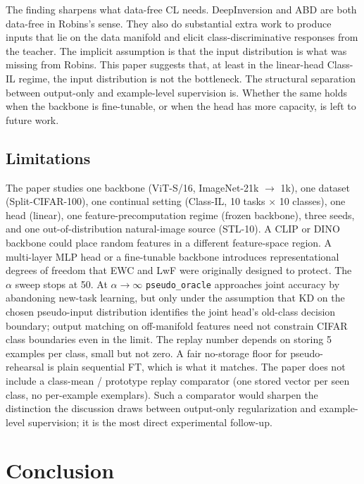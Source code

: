 \documentclass[conference]{IEEEtran}
\begin{document}
The finding sharpens what data-free CL needs. DeepInversion
\citep{yin2020deepinversion} and ABD \citep{smith2021abd} are both
data-free in Robins's sense. They also do substantial extra work to
produce inputs that lie on the data manifold and elicit class-discriminative
responses from the teacher. The implicit assumption is that the input
distribution is what was missing from Robins. This paper suggests that, at
least in the linear-head Class-IL regime, the input distribution is not
the bottleneck. The structural separation between output-only and
example-level supervision is. Whether the same holds when the backbone is
fine-tunable, or when the head has more capacity, is left to future work.

\subsection{Limitations}

The paper studies one backbone (ViT-S/16, ImageNet-21k $\to$ 1k), one
dataset (Split-CIFAR-100), one continual setting (Class-IL, 10 tasks
$\times$ 10 classes), one head (linear), one feature-precomputation regime
(frozen backbone), three seeds, and one out-of-distribution natural-image
source (STL-10). A CLIP or DINO backbone could place random features in a
different feature-space region. A multi-layer MLP head or a fine-tunable
backbone introduces representational degrees of freedom that EWC and LwF
were originally designed to protect. The $\alpha$ sweep stops at 50. At
$\alpha \to \infty$ \texttt{pseudo\_oracle} approaches joint accuracy by
abandoning new-task learning, but only under the assumption that KD on
the chosen pseudo-input distribution identifies the joint head's
old-class decision boundary; output matching on off-manifold features
need not constrain CIFAR class boundaries even in the limit. The replay
number depends on storing 5 examples per class, small but not zero. A
fair no-storage floor for pseudo-rehearsal is plain sequential FT, which
is what it matches. The paper does not include a class-mean / prototype
replay comparator (one stored vector per seen class, no per-example
exemplars). Such a comparator would sharpen the distinction the
discussion draws between output-only regularization and example-level
supervision; it is the most direct experimental follow-up.

\section{Conclusion}
\end{document}
